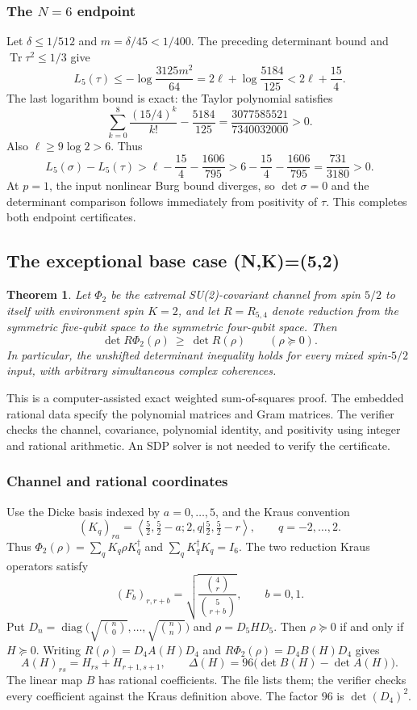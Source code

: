 \documentclass[11pt,a4paper]{article}
\newcommand{\Tr}{\operatorname{Tr}}
\newtheorem{theorem}{Theorem}
\newcommand{\diag}{\operatorname{diag}}
\begin{document}
\subsubsection{The $N=6$ endpoint}
Let $\delta\le1/512$ and $m=\delta/45<1/400$.
The preceding determinant bound and $\Tr\tau^2\le1/3$ give
\[
L_5(\tau)\le-\log\frac{3125m^2}{64}
=2\ell+\log\frac{5184}{125}<2\ell+\frac{15}{4}.
\]
The last logarithm bound is exact: the Taylor polynomial satisfies
\[
\sum_{k=0}^8\frac{(15/4)^k}{k!}-\frac{5184}{125}
=\frac{3077585521}{7340032000}>0.
\]
Also $\ell\ge9\log2>6$. Thus
\[
L_5(\sigma)-L_5(\tau)
>\ell-\frac{15}{4}-\frac{1606}{795}
>6-\frac{15}{4}-\frac{1606}{795}
=\frac{731}{3180}>0.
\]
At $p=1$, the input nonlinear Burg bound diverges, so $\det\sigma=0$
and the determinant comparison follows immediately from positivity of
$\tau$. This completes both endpoint certificates.




\subsection{The exceptional base case (N,K)=(5,2)}
\begin{theorem}
Let $\Phi_2$ be the extremal SU(2)-covariant channel from spin $5/2$ to itself
with environment spin $K=2$, and let $R=R_{5,4}$ denote reduction from the
symmetric five-qubit space to the symmetric four-qubit space. Then
\[
 \boxed{\det R\Phi_2(\rho)\ \geq\ \det R(\rho)\qquad(\rho\succeq0).}
\]
In particular, the unshifted determinant inequality holds for every mixed
spin-$5/2$ input, with arbitrary simultaneous complex coherences.
\end{theorem}

This is a computer-assisted exact weighted sum-of-squares proof. The embedded
rational data specify the polynomial matrices and Gram matrices. The verifier
checks the channel, covariance, polynomial identity, and positivity using
integer and rational arithmetic. An SDP solver is not needed to verify the
certificate.

\subsubsection{Channel and rational coordinates}
Use the Dicke basis indexed by $a=0,\ldots,5$, and the Kraus convention
\[
 (K_q)_{ra}=\left\langle \tfrac52,\tfrac52-a;2,q
       \mathrel{\big|}\tfrac52,\tfrac52-r\right\rangle,
 \qquad q=-2,\ldots,2.
\]
Thus $\Phi_2(\rho)=\sum_qK_q\rho K_q^\dagger$ and
$\sum_qK_q^\dagger K_q=I_6$. The two reduction Kraus operators satisfy
\[
 (F_b)_{r,r+b}=\sqrt{\frac{\binom4r}{\binom5{r+b}}},\qquad b=0,1.
\]
Put $D_n=\diag\bigl(\sqrt{\binom n0},\ldots,\sqrt{\binom nn}\bigr)$ and
$\rho=D_5HD_5$. Then $\rho\succeq0$ if and only if $H\succeq0$.
Writing $R(\rho)=D_4A(H)D_4$ and $R\Phi_2(\rho)=D_4B(H)D_4$ gives
\[
 A(H)_{rs}=H_{rs}+H_{r+1,s+1},\qquad
 \Delta(H)=96\bigl(\det B(H)-\det A(H)\bigr).
\]
The linear map $B$ has rational coefficients. The file
 lists them; the verifier checks
every coefficient against the Kraus definition above. The factor $96$ is
$\det(D_4)^2$.
\end{document}
